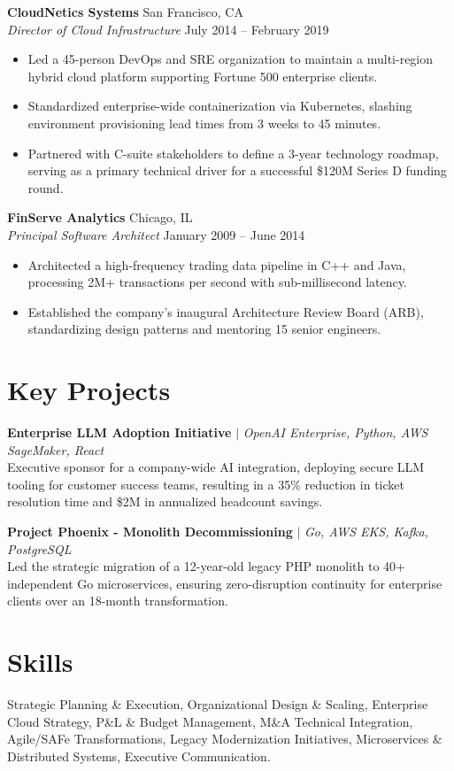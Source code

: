 \documentclass[11pt,letterpaper]{article}
\begin{document}
\textbf{CloudNetics Systems} \hfill San Francisco, CA \\
\textit{Director of Cloud Infrastructure} \hfill July 2014 -- February 2019
\begin{itemize}
    \item Led a 45-person DevOps and SRE organization to maintain a multi-region hybrid cloud platform supporting Fortune 500 enterprise clients.
    \item Standardized enterprise-wide containerization via Kubernetes, slashing environment provisioning lead times from 3 weeks to 45 minutes.
    \item Partnered with C-suite stakeholders to define a 3-year technology roadmap, serving as a primary technical driver for a successful \$120M Series D funding round.
\end{itemize}

\textbf{FinServe Analytics} \hfill Chicago, IL \\
\textit{Principal Software Architect} \hfill January 2009 -- June 2014
\begin{itemize}
    \item Architected a high-frequency trading data pipeline in C++ and Java, processing 2M+ transactions per second with sub-millisecond latency.
    \item Established the company's inaugural Architecture Review Board (ARB), standardizing design patterns and mentoring 15 senior engineers.
\end{itemize}

\section{Key Projects}
\textbf{Enterprise LLM Adoption Initiative} $|$ \textit{OpenAI Enterprise, Python, AWS SageMaker, React} \\
Executive sponsor for a company-wide AI integration, deploying secure LLM tooling for customer success teams, resulting in a 35\% reduction in ticket resolution time and \$2M in annualized headcount savings.

\textbf{Project Phoenix - Monolith Decommissioning} $|$ \textit{Go, AWS EKS, Kafka, PostgreSQL} \\
Led the strategic migration of a 12-year-old legacy PHP monolith to 40+ independent Go microservices, ensuring zero-disruption continuity for enterprise clients over an 18-month transformation.

\section{Skills}
Strategic Planning \& Execution, Organizational Design \& Scaling, Enterprise Cloud Strategy, P\&L \& Budget Management, M\&A Technical Integration, Agile/SAFe Transformations, Legacy Modernization Initiatives, Microservices \& Distributed Systems, Executive Communication.
\end{document}
